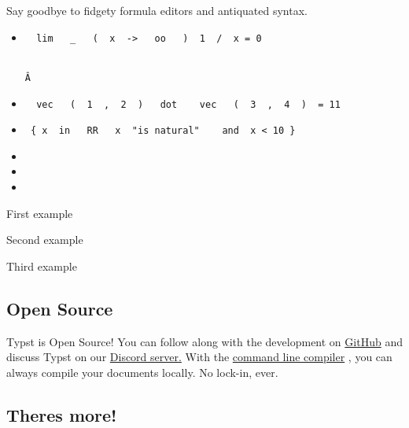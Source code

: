 Say goodbye to fidgety formula editors and antiquated syntax.

\begin{itemize}
\tightlist
\item
  \texttt{\ }{\texttt{\ lim\ }}\texttt{\ }{\texttt{\ \_\ }}\texttt{\ }{\texttt{\ (\ }}\texttt{\ x\ }{\texttt{\ -\textgreater{}\ }}\texttt{\ }{\texttt{\ oo\ }}\texttt{\ }{\texttt{\ )\ }}\texttt{\ 1\ }{\texttt{\ /\ }}\texttt{\ x\ =\ 0}\strut \\
  \texttt{Â\ }
\item
  \texttt{\ }{\texttt{\ vec\ }}\texttt{\ }{\texttt{\ (\ }}\texttt{\ 1\ }{\texttt{\ ,\ }}\texttt{\ 2\ }{\texttt{\ )\ }}\texttt{\ }{\texttt{\ dot\ }}\texttt{\ }{\texttt{\ }{\texttt{\ vec\ }}\texttt{\ }{\texttt{\ (\ }}\texttt{\ 3\ }{\texttt{\ ,\ }}\texttt{\ 4\ }{\texttt{\ )\ }}\texttt{\ =\ 11\ }}\texttt{\ }
\item
  \texttt{\ \{\ x\ }{\texttt{\ in\ }}\texttt{\ }{\texttt{\ RR\ }}\texttt{\ \textbar{}\ x\ }{\texttt{\ "is\ natural"\ }}\texttt{\ }{\texttt{\ }{\texttt{\ and\ }}\texttt{\ x\ \textless{}\ 10\ \}\ }}\texttt{\ }
\end{itemize}

\begin{itemize}
\tightlist
\item
\item
\item
\end{itemize}

\label{math-buttons}
First example

Second example

Third example

\label{oss}
\subsection{Open Source}\label{open-source}



Typst is Open Source! You can follow along with the development on
\href{https://github.com/typst/typst}{GitHub} and discuss Typst on our
\href{https://discord.gg/2uDybryKPe}{Discord server.} With the
\href{https://github.com/typst/typst/releases}{command line compiler} ,
you can always compile your documents locally. No lock-in, ever.

\label{coming-soon}
\subsection{There\textquotesingle s more!}\label{theres-more}

